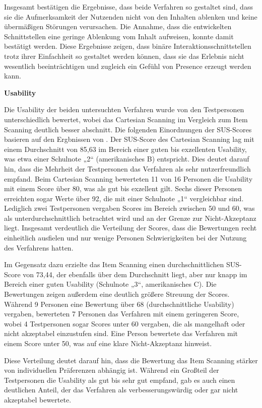 Insgesamt bestätigen die Ergebnisse, dass beide Verfahren so gestaltet sind, dass sie die Aufmerksamkeit der Nutzenden nicht von den Inhalten ablenken und keine übermäßigen Störungen verursachen. Die Annahme, dass die entwickelten Schnittstellen eine geringe Ablenkung vom Inhalt aufweisen, konnte damit bestätigt werden. Diese Ergebnisse zeigen, dass binäre Interaktionsschnittstellen trotz ihrer Einfachheit so gestaltet werden können, dass sie das Erlebnis nicht wesentlich beeinträchtigen und zugleich ein Gefühl von Presence erzeugt werden kann.

\textbf{Usability}

Die Usability der beiden untersuchten Verfahren wurde von den Testpersonen unterschiedlich bewertet, wobei das Cartesian Scanning im Vergleich zum Item Scanning deutlich besser abschnitt. Die folgenden Einordnungen der SUS-Scores basieren auf den Ergbnissen von \citet{bangor_empirical_2008}. Der SUS-Score des Cartesian Scanning lag mit einem Durchschnitt von 85,63 im Bereich einer guten bis exzellenten Usability, was etwa einer Schulnote „2“ (amerikanisches B) entspricht. Dies deutet darauf hin, dass die Mehrheit der Testpersonen das Verfahren als sehr nutzerfreundlich empfand.
Beim Cartesian Scanning bewerteten 11 von 16 Personen die Usability mit einem Score über 80, was als gut bis exzellent gilt. Sechs dieser Personen erreichten sogar Werte über 92, die mit einer Schulnote „1“ vergleichbar sind. Lediglich zwei Testpersonen vergaben Scores im Bereich zwischen 50 und 60, was als unterdurchschnittlich betrachtet wird und an der Grenze zur Nicht-Akzeptanz liegt. Insgesamt verdeutlich die Verteilung der Scores, dass die Bewertungen recht einheitlich ausfielen und nur wenige Personen Schwierigkeiten bei der Nutzung des Verfahrens hatten.

Im Gegensatz dazu erzielte das Item Scanning einen durchschnittlichen SUS-Score von 73,44, der ebenfalls über dem Durchschnitt liegt, aber nur knapp im Bereich einer guten Usability (Schulnote „3“, amerikanisches C). Die Bewertungen zeigen außerdem eine deutlich größere Streuung der Scores. Während 9 Personen eine Bewertung über 68 (durchschnittliche Usability) vergaben, bewerteten 7 Personen das Verfahren mit einem geringeren Score, wobei 4 Testpersonen sogar Scores unter 60 vergaben, die als mangelhaft oder nicht akzeptabel einzustufen sind. Eine Person bewertete das Verfahren mit einem Score unter 50, was auf eine klare Nicht-Akzeptanz hinweist.

Diese Verteilung deutet darauf hin, dass die Bewertung das Item Scanning stärker von individuellen Präferenzen abhängig ist. Während ein Großteil der Testpersonen die Usability als gut bis sehr gut empfand, gab es auch einen deutlichen Anteil, der das Verfahren als verbesserungswürdig oder gar nicht akzeptabel bewertete.

